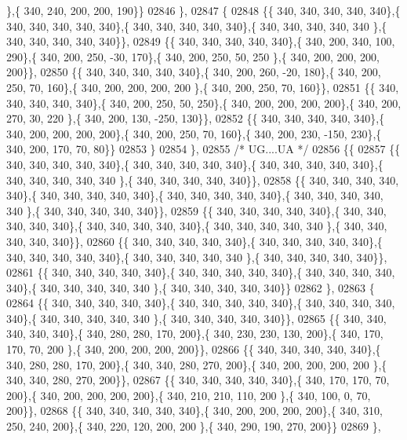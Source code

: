 \begin{DoxyCode}
      \},\{ 340, 240, 200, 200, 190\}\}
02846 \},
02847 \{
02848 \{\{ 340, 340, 340, 340, 340\},\{ 340, 340, 340, 340, 340\},\{ 340, 340, 340, 340, 340\},\{ 340, 340, 340, 340, 340
      \},\{ 340, 340, 340, 340, 340\}\},
02849 \{\{ 340, 340, 340, 340, 340\},\{ 340, 200, 340, 100, 290\},\{ 340, 200, 250, -30, 170\},\{ 340, 200, 250,  50, 250
      \},\{ 340, 200, 200, 200, 200\}\},
02850 \{\{ 340, 340, 340, 340, 340\},\{ 340, 200, 260, -20, 180\},\{ 340, 200, 250,  70, 160\},\{ 340, 200, 200, 200, 200
      \},\{ 340, 200, 250,  70, 160\}\},
02851 \{\{ 340, 340, 340, 340, 340\},\{ 340, 200, 250,  50, 250\},\{ 340, 200, 200, 200, 200\},\{ 340, 200, 270,  30, 220
      \},\{ 340, 200, 130, -250, 130\}\},
02852 \{\{ 340, 340, 340, 340, 340\},\{ 340, 200, 200, 200, 200\},\{ 340, 200, 250,  70, 160\},\{ 340, 200, 230, -150, 
      230\},\{ 340, 200, 170,  70,  80\}\}
02853 \}
02854 \},
02855 \textcolor{comment}{/* UG....UA */}
02856 \{\{
02857 \{\{ 340, 340, 340, 340, 340\},\{ 340, 340, 340, 340, 340\},\{ 340, 340, 340, 340, 340\},\{ 340, 340, 340, 340, 340
      \},\{ 340, 340, 340, 340, 340\}\},
02858 \{\{ 340, 340, 340, 340, 340\},\{ 340, 340, 340, 340, 340\},\{ 340, 340, 340, 340, 340\},\{ 340, 340, 340, 340, 340
      \},\{ 340, 340, 340, 340, 340\}\},
02859 \{\{ 340, 340, 340, 340, 340\},\{ 340, 340, 340, 340, 340\},\{ 340, 340, 340, 340, 340\},\{ 340, 340, 340, 340, 340
      \},\{ 340, 340, 340, 340, 340\}\},
02860 \{\{ 340, 340, 340, 340, 340\},\{ 340, 340, 340, 340, 340\},\{ 340, 340, 340, 340, 340\},\{ 340, 340, 340, 340, 340
      \},\{ 340, 340, 340, 340, 340\}\},
02861 \{\{ 340, 340, 340, 340, 340\},\{ 340, 340, 340, 340, 340\},\{ 340, 340, 340, 340, 340\},\{ 340, 340, 340, 340, 340
      \},\{ 340, 340, 340, 340, 340\}\}
02862 \},
02863 \{
02864 \{\{ 340, 340, 340, 340, 340\},\{ 340, 340, 340, 340, 340\},\{ 340, 340, 340, 340, 340\},\{ 340, 340, 340, 340, 340
      \},\{ 340, 340, 340, 340, 340\}\},
02865 \{\{ 340, 340, 340, 340, 340\},\{ 340, 280, 280, 170, 200\},\{ 340, 230, 230, 130, 200\},\{ 340, 170, 170,  70, 200
      \},\{ 340, 200, 200, 200, 200\}\},
02866 \{\{ 340, 340, 340, 340, 340\},\{ 340, 280, 280, 170, 200\},\{ 340, 340, 280, 270, 200\},\{ 340, 200, 200, 200, 200
      \},\{ 340, 340, 280, 270, 200\}\},
02867 \{\{ 340, 340, 340, 340, 340\},\{ 340, 170, 170,  70, 200\},\{ 340, 200, 200, 200, 200\},\{ 340, 210, 210, 110, 200
      \},\{ 340, 100,   0,  70, 200\}\},
02868 \{\{ 340, 340, 340, 340, 340\},\{ 340, 200, 200, 200, 200\},\{ 340, 310, 250, 240, 200\},\{ 340, 220, 120, 200, 200
      \},\{ 340, 290, 190, 270, 200\}\}
02869 \},

\end{DoxyCode}
